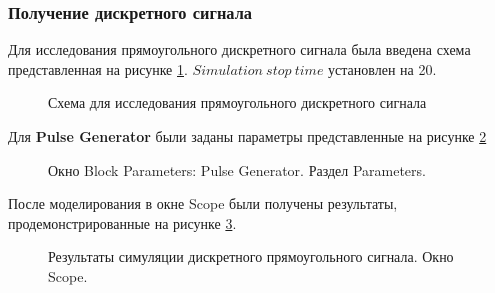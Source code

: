 \documentclass[a4paper,14pt]{extarticle}
\begin{document}
\subsubsection{Получение дискретного сигнала}

Для исследования прямоугольного дискретного сигнала была введена 
схема представленная на рисунке \ref{008}. $Simulation \ stop \ 
time$ установлен на 20.

\begin{figure}[H]
\caption{Схема для исследования прямоугольного дискретного 
сигнала}
\label{008}
\end{figure}

Для \textbf{Pulse Generator} были заданы параметры представленные 
на рисунке \ref{009}

\begin{figure}[H]
\caption{Окно Block Parameters: Pulse Generator. Раздел 
Parameters.}
\label{009}
\end{figure}

После моделирования в окне Scope были получены результаты, 
продемонстрированные на рисунке \ref{010}.

\begin{figure}[H]
\caption{Результаты симуляции дискретного прямоугольного сигнала. 
Окно Scope.}
\label{010}
\end{figure}
\end{document}
